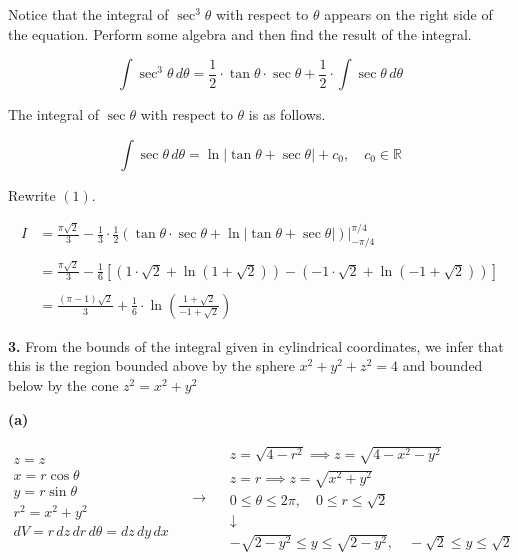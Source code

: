 \documentclass{article}
\begin{document}
Notice that the integral of $\sec^3\theta$ with respect to $\theta$ appears on the right side of the equation. Perform some algebra and then find the result of the integral.

\begin{equation*}\int\sec^3\theta\,d\theta=\frac12\cdot\tan\theta\cdot\sec\theta+\frac12\cdot\int\sec\theta\,d\theta\end{equation*}

The integral of $\sec\theta$ with respect to $\theta$ is as follows.

\begin{equation*}\int\sec\theta\,d\theta=\ln\left|\tan\theta+\sec\theta\right|+c_0,\quad c_0\in\mathbb{R}\end{equation*}

Rewrite $(1)$.

\begin{align*}{I}&=\frac{\pi\sqrt2}3-\frac13\cdot\frac12\left(\tan\theta\cdot\sec\theta+\ln\left|\tan\theta+\sec\theta\right|\right)\bigg|_{-\pi/4}^{\pi/4}\\\\&=\frac{\pi\sqrt2}3-\frac16\left[\left(1\cdot\sqrt2+\ln\left(1+\sqrt2\right)\right)-\left(-1\cdot\sqrt2+\ln\left(-1+\sqrt2\right)\right)\right]\\\\&=\boxed{\frac{(\pi-1)\sqrt2}3+\frac16\cdot\ln\left(\frac{1+\sqrt2}{-1+\sqrt2}\right)}\end{align*}

\vspace{1em}

\textbf{3.} From the bounds of the integral given in cylindrical coordinates, we infer that this is the region bounded above by the sphere $x^2+y^2+z^2=4$ and bounded below by the cone $z^2=x^2+y^2$ 

\textbf{(a)}

\[
\begin{array}{c}
z=z\\
x=r\cos\theta\\
y=r\sin\theta\\
r^2=x^2+y^2\\
dV=r\,dz\,dr\,d\theta=dz\,dy\,dx
\end{array}\quad\rightarrow\quad
\begin{array}{c}
z=\sqrt{4-r^2}\implies z=\sqrt{4-x^2-y^2}\\
z=r\implies z=\sqrt{x^2+y^2}\\[1em]
0\leq\theta\leq2\pi,\quad 0\leq r\leq\sqrt2\\[0.2cm]
\downarrow\\[0.2cm]
-\sqrt{2-y^2}\leq y\leq\sqrt{2-y^2},\quad -\sqrt2\leq y\leq\sqrt2
\end{array}
\]
\end{document}

